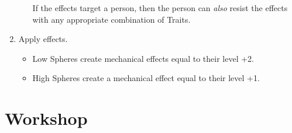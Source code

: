 \begin{multicols}{2}
\begin{enumerate}
\begin{itemize}
    If the effects target a person, then the person can \emph{also} resist the effects with any appropriate combination of Traits.
  \end{itemize}
  \item
  Apply effects.
  \begin{itemize}
    \item
    Low Spheres create mechanical effects equal to their level +2.
    \item
    High Spheres create a mechanical effect equal to their level +1.
  \end{itemize}
\end{enumerate}

\end{multicols}

{
  \centering
  \speltagram
  \label{speltagram}
}

\section{ Workshop}


